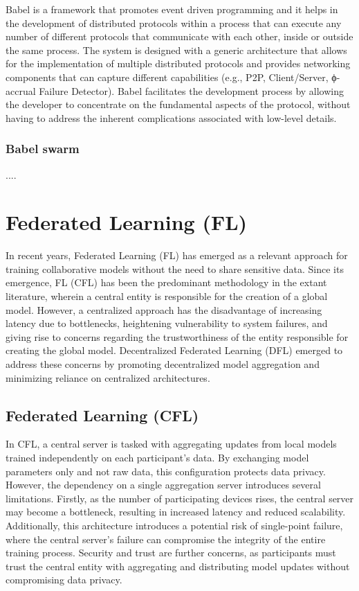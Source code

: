 Babel is a framework that promotes event driven programming and it helps in the development of distributed protocols within a process that can execute any number of different protocols that communicate with each other, inside or outside the same process. The system is designed with a generic architecture that allows for the implementation of multiple distributed protocols and provides networking components that can capture different capabilities (e.g., P2P, Client/Server, ϕ-accrual Failure Detector). 
Babel facilitates the development process by allowing the developer to concentrate on the fundamental aspects of the protocol, without having to address the inherent complications associated with low-level details.

\subsubsection{Babel swarm}
\label{sec:babel_swarm}

....


\section{Federated Learning (FL)}
\label{sec:federated_laerning}

In recent years, Federated Learning (FL) has emerged as a relevant approach for training collaborative models without the need to share sensitive data. Since its emergence, FL (CFL) has been the predominant methodology in the extant literature, wherein a central entity is responsible for the creation of a global model. However, a centralized approach has the disadvantage of increasing latency due to bottlenecks, heightening vulnerability to system failures, and giving rise to concerns regarding the trustworthiness of the entity responsible for creating the global model. Decentralized Federated Learning (DFL) emerged to address these concerns by promoting decentralized model aggregation and minimizing reliance on centralized architectures.

\subsection{Federated Learning (CFL)}
\label{sub:federated_learning}

In CFL, a central server is tasked with aggregating updates from local models trained independently on each participant’s data. By exchanging model parameters only and not raw data, this configuration protects data privacy. However, the dependency on a single aggregation server introduces several limitations. Firstly, as the number of participating devices rises, the central server may become a bottleneck, resulting in increased latency and reduced scalability. Additionally, this architecture introduces a potential risk of single-point failure, where the central server’s failure can compromise the integrity of the entire training process. Security and trust are further concerns, as participants must trust the central entity with aggregating and distributing model updates without compromising data privacy.

